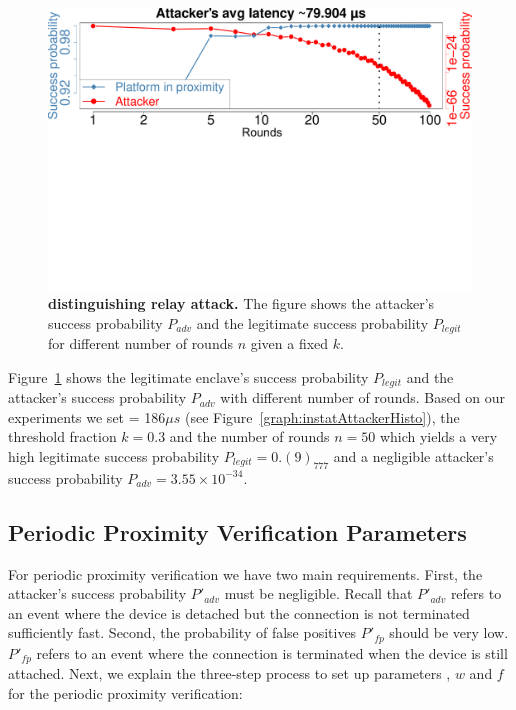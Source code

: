 \begin{figure}[h]
  \centering
    \includegraphics[trim={0 12.8cm 0 0}, clip, width=0.9\linewidth]{chapters/ProximiTEE/figures/InstantAttackerSuccess.pdf}
    \caption[\name distinguishing relay attack]{\textbf{\name distinguishing relay attack.} The figure shows the attacker's success probability $P_{adv}$ and the legitimate success probability $P_{legit}$ for different number of rounds $n$ given a fixed $k$.}

    \label{graph:instantAttackerSuccess}
\end{figure}


 Figure~\ref{graph:instantAttackerSuccess} shows the legitimate enclave's success probability $P_{legit}$ and the attacker's success probability $P_{adv}$ with different number of rounds. Based on our experiments we set \connect= 186$\mu s$ (see Figure~\ref{graph:instatAttackerHisto}), the threshold fraction $k=0.3$ and the number of rounds $n=50$ which yields a very high legitimate success probability $P_{legit}=0.(9)_777$ and a negligible attacker's success probability $P_{adv}=3.55\times 10^{-34}$.





\subsection{Periodic Proximity Verification Parameters}
\label{sec:evaluationL:continuousParameters}


For periodic proximity verification we have two main requirements. First, the attacker's success probability $P'_{adv}$ must be negligible. Recall that $P'_{adv}$ refers to an event where the device is detached but the connection is not terminated sufficiently fast. Second, the probability of false positives $P'_{fp}$ should be very low. $P'_{fp}$ refers to an event where the connection is terminated when the device is still attached. Next, we explain the three-step process to set up parameters \detach, $w$ and $f$ for the periodic proximity verification:

